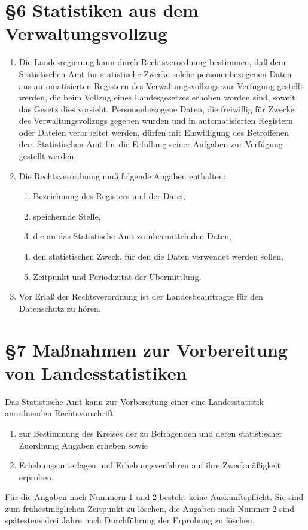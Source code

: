     \section{\S6 Statistiken aus dem Verwaltungsvollzug}
        \begin{enumerate}[label=(\arabic*)]
            \item Die Landesregierung kann durch Rechtsverordnung bestimmen, daß dem Statistischen Amt für statistische Zwecke solche personenbezogenen Daten aus automatisierten Registern des Verwaltungsvollzugs zur Verfügung gestellt werden, die beim Vollzug eines Landesgesetzes erhoben worden sind, soweit das Gesetz dies vorsieht. Personenbezogene Daten, die freiwillig für Zwecke des Verwaltungsvollzugs gegeben wurden und in automatisierten Registern oder Dateien verarbeitet werden, dürfen mit Einwilligung des Betroffenen dem Statistischen Amt für die Erfüllung seiner Aufgaben zur Verfügung gestellt werden.
            \item Die Rechtsverordnung muß folgende Angaben enthalten:
            \begin{enumerate}[label=\arabic*.]
                \item Bezeichnung des Registers und der Datei,
                \item speichernde Stelle,
                \item die an das Statistische Amt zu übermittelnden Daten,
                \item den statistischen Zweck, für den die Daten verwendet werden sollen,
                \item Zeitpunkt und Periodizität der Übermittlung. 
            \end{enumerate}
            \item Vor Erlaß der Rechtsverordnung ist der Landesbeauftragte für den Datenschutz zu hören.
        \end{enumerate}


 
    \section{\S7 Maßnahmen zur Vorbereitung von Landesstatistiken}
    Das Statistische Amt kann zur Vorbereitung einer eine Landesstatistik anordnenden Rechtsvorschrift
        \begin{enumerate}[label=\arabic*.]
            \item zur Bestimmung des Kreises der zu Befragenden und deren statistischer Zuordnung Angaben erheben sowie
            \item Erhebungsunterlagen und Erhebungsverfahren auf ihre Zweckmäßigkeit erproben.
        \end{enumerate}
    Für die Angaben nach Nummern 1 und 2 besteht keine Auskunftspflicht. Sie sind zum frühestmöglichen Zeitpunkt zu löschen, die Angaben nach Nummer 2 sind spätestens drei Jahre nach Durchführung der Erprobung zu löschen.

